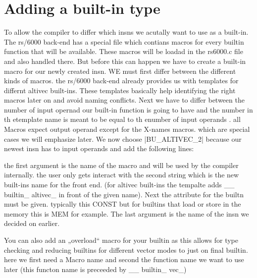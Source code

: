 \chapter{Adding a built-in type}
\label{chapter:adding builtin}

To allow the compiler to differ which insns we acutally want to use as a built-in. The rs/6000 back-end has a special file which contians macros for every builtin function that will be available. These  macros will be loadad in the rs6000.c file and also handled there. But before this can happen we have to create a built-in macro for our newly created insn.
WE must first differ between the different kinds of macros. the rs/6000 back-end already provides us with templates for differnt altivec built-ins. These templates basically help identifying the right macros later on and avoid naming conflicts.
Next we have to differ between the number of input opernad our built-in function is going to have and the number  in th etemplate name is meant to be equal to th enumber of input operands . all Macros expect output operand except for the X-names macros. which are special cases we will emphasize later.
We now choose |BU_ALTIVEC_2| because our newest insn has to input operands and add the following lines:

the first argument is the name of the macro and will be used by the compiler internally. the user only gets interact with the second string which is the new built-ins name for the front end. (for altivec built-ins the tempalte adds \_\_ builtin\_ altivec\_ in front of the given name). Next the attribute for the builtn must be given. typically this CONST but for builtins that load or store in the memory this is MEM for example. The last argument is the name of the insn we decided on earlier.

You can also add an „overload“ macro for your builtin as this allows for type checking and reducing builtins for different vector modes to just on final builtin.
here we first need a Macro name and second the function name we want to use later (this functon name is preceeded by \_\_ builtin\_ vec\_)



\nocite{berge_iscas07}
